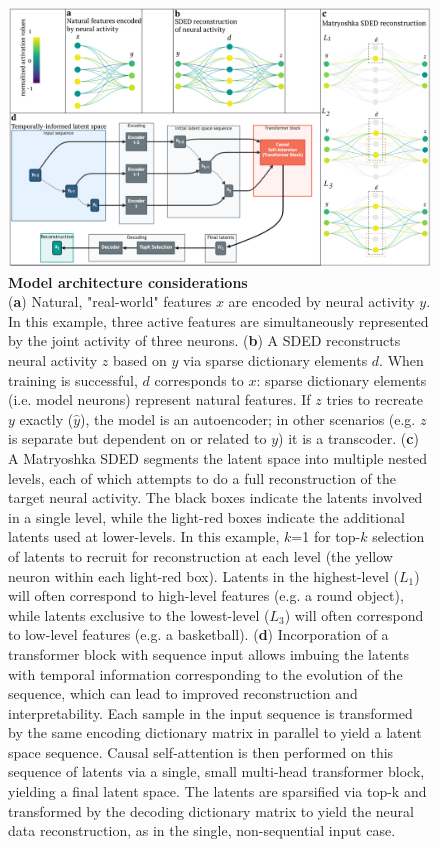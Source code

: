 \documentclass{article}
\begin{document}
\begin{figure}[tbph]
    \includegraphics[width=\linewidth]{../figures/sded_arch.pdf}
    \caption{
        \textbf{Model architecture considerations} \\
        \small
        (\textbf{a}) Natural, "real-world" features $x$ are encoded by neural activity $y$. In this example, three active features are simultaneously represented by the joint activity of three neurons. (\textbf{b}) A SDED reconstructs neural activity $z$ based on $y$ via sparse dictionary elements $d$. When training is successful, $d$ corresponds to $x$: sparse dictionary elements (i.e. model neurons) represent natural features. If $z$ tries to recreate $y$ exactly ($\hat{y}$), the model is an autoencoder; in other scenarios (e.g. $z$ is separate but dependent on or related to $y$) it is a transcoder. (\textbf{c}) A Matryoshka SDED segments the latent space into multiple nested levels, each of which attempts to do a full reconstruction of the target neural activity. The black boxes indicate the latents involved in a single level, while the light-red boxes indicate the additional latents used at lower-levels. In this example, $k$=1 for top-$k$ selection of latents to recruit for reconstruction at each level (the yellow neuron within each light-red box). Latents in the highest-level ($L_1$) will often correspond to high-level features (e.g. a round object), while latents exclusive to the lowest-level ($L_3$) will often correspond to low-level features (e.g. a basketball). (\textbf{d}) Incorporation of a transformer block with sequence input allows imbuing the latents with temporal information corresponding to the evolution of the sequence, which can lead to improved reconstruction and interpretability. Each sample in the input sequence is transformed by the same encoding dictionary matrix in parallel to yield a latent space sequence. Causal self-attention is then performed on this sequence of latents via a single, small multi-head transformer block, yielding a final latent space. The latents are sparsified via top-k and transformed by the decoding dictionary matrix to yield the neural data reconstruction, as in the single, non-sequential input case.
        \vspace{-1em}
    }
    \label{figure:sded_arch}
\end{figure}



\end{document}
